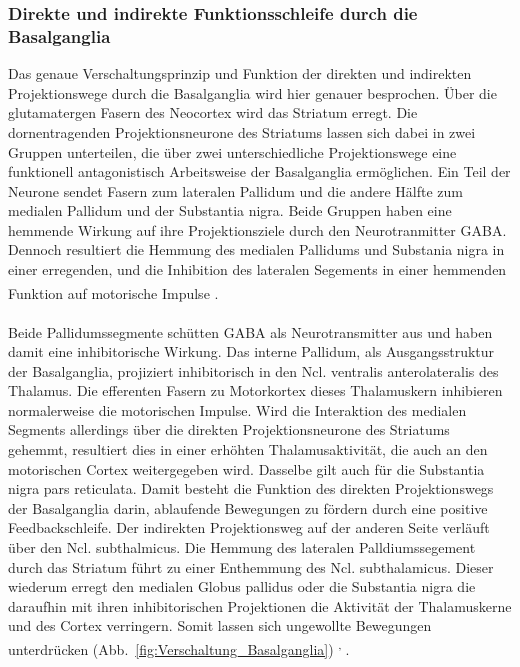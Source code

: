 \subsubsection*{Direkte und indirekte Funktionsschleife durch die Basalganglia}
Das genaue Verschaltungsprinzip und Funktion der direkten und indirekten Projektionswege durch die Basalganglia wird hier genauer besprochen. Über die glutamatergen Fasern des Neocortex wird das Striatum erregt. Die dornentragenden Projektionsneurone des Striatums lassen sich dabei in zwei Gruppen unterteilen, die über zwei unterschiedliche Projektionswege eine funktionell antagonistisch Arbeitsweise der Basalganglia ermöglichen. Ein Teil der Neurone sendet Fasern zum lateralen Pallidum und die andere Hälfte zum medialen Pallidum und der Substantia nigra. Beide Gruppen haben eine hemmende Wirkung auf ihre Projektionsziele durch den Neurotranmitter GABA. Dennoch resultiert die Hemmung des medialen Pallidums und Substania nigra in einer erregenden, und die Inhibition des lateralen Segements in einer hemmenden Funktion auf motorische Impulse \textsuperscript{\cite[Kap.~9]{trepel2011neuroanatomie}}. \\  
\\ \noindent Beide Pallidumssegmente schütten GABA als Neurotransmitter aus und haben damit eine inhibitorische Wirkung. Das interne Pallidum, als Ausgangsstruktur der Basalganglia, projiziert inhibitorisch in den Ncl. ventralis anterolateralis des Thalamus. Die efferenten Fasern zu Motorkortex dieses Thalamuskern inhibieren normalerweise die motorischen Impulse. Wird die Interaktion des medialen Segments allerdings über die direkten Projektionsneurone des Striatums gehemmt, resultiert dies in einer erhöhten Thalamusaktivität, die auch an den motorischen Cortex weitergegeben wird. Dasselbe gilt auch für die Substantia nigra pars reticulata. Damit besteht die Funktion des direkten Projektionswegs der Basalganglia darin, ablaufende Bewegungen zu fördern durch eine positive Feedbackschleife. Der indirekten Projektionsweg auf der anderen Seite verläuft über den Ncl. subthalmicus. Die Hemmung des lateralen Palldiumssegement durch das Striatum führt zu einer Enthemmung des Ncl. subthalamicus. Dieser wiederum erregt den medialen Globus pallidus oder die Substantia nigra die daraufhin mit ihren inhibitorischen Projektionen die Aktivität der Thalamuskerne und des Cortex verringern. Somit lassen sich ungewollte Bewegungen unterdrücken (Abb.~\ref{fig:Verschaltung_Basalganglia}) \textsuperscript{\cite[Kap.~14]{crossman2014neuroanatomy}, \cite[9]{trepel2011neuroanatomie}}.\\ 
